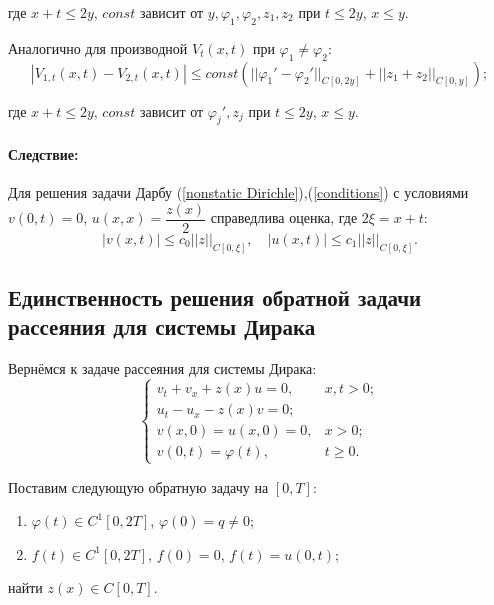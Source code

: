 \documentclass{article}
\newenvironment{hence}{ \paragraph{Следствие:}}{}
\begin{document}
где $x+t \leqslant 2y$, $const$ зависит от $y, \varphi_1, \varphi_2, z_1, z_2$ при $t\leqslant 2y$, $x\leqslant y$.

Аналогично для производной $V_t(x,t)$ при $\varphi_1 \neq \varphi_2$:
\begin{equation*}
	|V_{1,t} (x,t) - V_{2,t}(x,t)| \leqslant 
	const(||\varphi_1' - \varphi_2'||_{C[0,2y]} + ||z_1 + z_2||_{C[0,y]});
\end{equation*}

где $x + t \leqslant 2y$, $const$ зависит от $\varphi_j', z_j$ при $t \leqslant 2y$, $x\leqslant y$.

\begin{hence}
Для решения задачи Дарбу (\ref{nonstatic Dirichle}),(\ref{conditions}) с условиями $v(0,t) = 0$, $u(x,x) = \dfrac{z(x)}{2}$ справедлива оценка, где $2\xi = x + t$:
\begin{equation*}
	|v(x,t)| \leqslant c_0 ||z||_{C[0,\xi]}, \quad
	|u(x,t)| \leqslant c_1 ||z||_{C[0,\xi]}.
\end{equation*}
\end{hence}

\subsection*{Единственность решения обратной задачи рассеяния для системы Дирака}

Вернёмся к задаче рассеяния для системы Дирака:
\begin{equation}
\begin{cases}
	v_t + v_x + z(x) u = 0, & x,t>0;\\
	u_t - u_x - z(x) v = 0;\\
	v(x,0) = u(x,0) = 0, & x > 0;\\
	v(0,t) = \varphi(t), & t \geqslant 0.
\end{cases}
\label{Dirak system}
\end{equation}

Поставим следующую обратную задачу на $[0,T]$:
\begin{enumerate}
\item $\varphi(t) \in C^1[0,2T]$, $\varphi(0) = q \neq 0$;
\item $f(t) \in C^1[0,2T]$, $f(0) = 0$, $ f(t) = u(0,t)$;
\end{enumerate}
найти $z(x) \in C[0,T]$.
\end{document}
